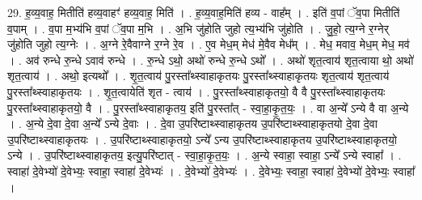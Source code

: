 \documentclass[17pt]{extarticle}
\begin{document}
29. ह॒व्य॒वाह॒ मितीति॑ हव्य॒वाहꣳ॑ हव्य॒वाह॒ मिति॑ । . ह॒व्य॒वाह॒मिति॑ हव्य - वाह᳚म् । . इति॑ व॒पां ॅव॒पा मितीति॑ व॒पाम् । . व॒पा म॒भ्य॑भि व॒पां ॅव॒पा म॒भि । . अ॒भि जु॑होति जुहो त्य॒भ्य॑भि जु॑होति । . जु॒हो॒ त्य॒ग्ने र॒ग्नेर् जु॑होति जुहो त्य॒ग्नेः । . अ॒ग्ने रे॒वैवाग्ने र॒ग्ने रे॒व । . ए॒व मेध॒म् मेध॑ मे॒वैव मेध᳚म् । . मेध॒ मवाव॒ मेध॒म् मेध॒ मव॑ । . अव॑ रुन्धे रु॒न्धे ऽवाव॑ रुन्धे । . रु॒न्धे ऽथो॒ अथो॑ रुन्धे रु॒न्धे ऽथो᳚ । . अथो॑ शृत॒त्वाय॑ शृत॒त्वाया थो॒ अथो॑ शृत॒त्वाय॑ । . अथो॒ इत्यथो᳚ । . शृ॒त॒त्वाय॑ पु॒रस्ता᳚थ्स्वाहाकृतयः पु॒रस्ता᳚थ्स्वाहाकृतयः शृत॒त्वाय॑ शृत॒त्वाय॑ पु॒रस्ता᳚थ्स्वाहाकृतयः । . शृ॒त॒त्वायेति॑ शृत - त्वाय॑ । . पु॒रस्ता᳚थ्स्वाहाकृतयो॒ वै वै पु॒रस्ता᳚थ्स्वाहाकृतयः पु॒रस्ता᳚थ्स्वाहाकृतयो॒ वै । . पु॒रस्ता᳚थ्स्वाहाकृतय॒ इति॑ पु॒रस्ता᳚त् - स्वा॒हा॒कृ॒त॒यः॒ । . वा अ॒न्ये᳚ ऽन्ये वै वा अ॒न्ये । . अ॒न्ये दे॒वा दे॒वा अ॒न्ये᳚ ऽन्ये दे॒वाः । . दे॒वा उ॒परि॑ष्टाथ्स्वाहाकृतय उ॒परि॑ष्टाथ्स्वाहाकृतयो दे॒वा दे॒वा उ॒परि॑ष्टाथ्स्वाहाकृतयः । . उ॒परि॑ष्टाथ्स्वाहाकृतयो॒ ऽन्ये᳚ ऽन्य उ॒परि॑ष्टाथ्स्वाहाकृतय उ॒परि॑ष्टाथ्स्वाहाकृतयो॒ ऽन्ये । . उ॒परि॑ष्टाथ्स्वाहाकृतय॒ इत्यु॒परि॑ष्टात् - स्वा॒हा॒कृ॒त॒यः॒ । . अ॒न्ये स्वाहा॒ स्वाहा॒ ऽन्ये᳚ ऽन्ये स्वाहा᳚ । . स्वाहा॑ दे॒वेभ्यो॑ दे॒वेभ्यः॒ स्वाहा॒ स्वाहा॑ दे॒वेभ्यः॑ । . दे॒वेभ्यो॑ दे॒वेभ्यः॑ । . दे॒वेभ्यः॒ स्वाहा॒ स्वाहा॑ दे॒वेभ्यो॑ दे॒वेभ्यः॒ स्वाहा᳚ । \newline
\end{document}
